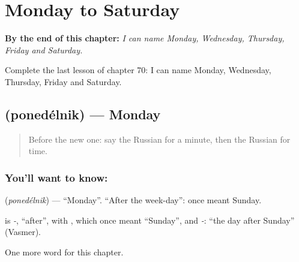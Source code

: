 
\chapter{Monday to Saturday}
\label{ch:ru-monday-to-saturday}

\begin{chapteropening}
\textbf{By the end of this chapter:} \emph{I can name Monday, Wednesday, Thursday, Friday and Saturday.}

Complete the last lesson of chapter 70: I can name Monday, Wednesday, Thursday, Friday and Saturday.
\end{chapteropening}

\section[\texorpdfstring{\ru{понедельник} (ponedélnik)}{понедельник (ponedélnik)}]{ (ponedélnik) — Monday}

\label{lesson:RU-C70-monday}



\begin{quote}
Before the new one: say the Russian for a minute, then the Russian for time.
\end{quote}

\subsection*{You'll want to know: }
\textbf{} (\emph{ponedélnik}) — \textquotedblleft{}Monday\textquotedblright{}. \textquotedblleft{}After the week-day\textquotedblright{}: \textbf{} once meant Sunday.

\begin{cousinweb}
\textbf{} is \emph{-}, \textquotedblleft{}after\textquotedblright{}, with \emph{}, which once meant \textquotedblleft{}Sunday\textquotedblright{}, and \emph{-}: \textquotedblleft{}the day after Sunday\textquotedblright{} (Vasmer).
\end{cousinweb}

\begin{grammarlens}[title={What you've built}]
One more word for this chapter.
\end{grammarlens}

